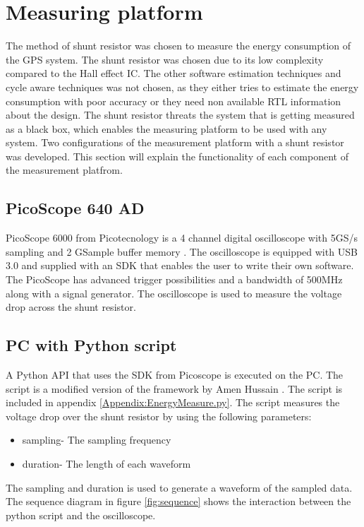 \chapter{Measuring platform}

The method of shunt resistor was chosen to measure the energy consumption of the GPS system. The shunt resistor was chosen due to its low complexity compared to the Hall effect IC.  The other software estimation techniques and cycle aware techniques was not chosen, as they either tries to estimate the energy consumption with poor accuracy or they need non available RTL information about the design. The shunt resistor threats the system that is getting measured as a black box, which enables the measuring platform to be used with any system. Two configurations of the measurement platform with a shunt resistor was developed. This section will explain the functionality of each component of the measurement platfrom.


\section{PicoScope 640 AD}
PicoScope 6000 from Picotecnology is a 4 channel digital oscilloscope with 5GS/s sampling and 2 GSample buffer memory \cite{Pico}. The oscilloscope is equipped with USB 3.0 and supplied with an SDK that enables the user to write their own software. The PicoScope has advanced trigger possibilities and a bandwidth of 500MHz along with a signal generator. The oscilloscope is used to measure the voltage drop across the shunt resistor.   

\section{PC with Python script}
A Python API that uses the SDK from Picoscope is executed on the PC. The script is a modified version of the framework by Amen Hussain \cite{Amen}. The script is included in appendix \ref{Appendix:EnergyMeasure.py}. The script measures the voltage drop over the shunt resistor by using the following parameters:

\begin{itemize}
    \item sampling- The sampling frequency 
    \item duration- The length of each waveform
    
\end{itemize}
The sampling and duration is used to generate a waveform of the sampled data.
The sequence diagram in figure \ref{fig:sequence} shows the interaction between the python script and the oscilloscope.  

